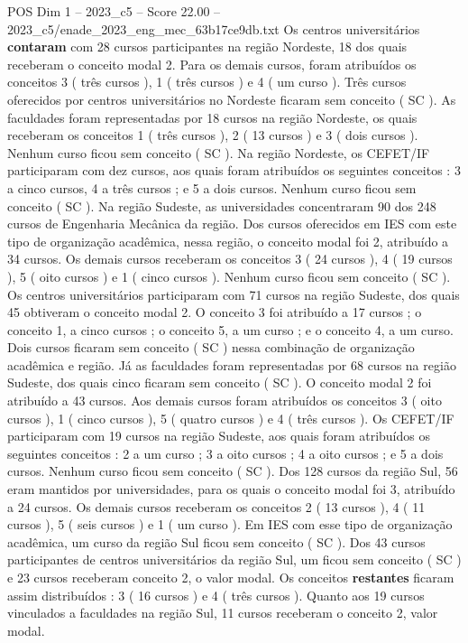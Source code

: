 \begin{textsample}{POS Dim 1 – 2023\_c5 – Score 22.00 – 2023\_c5/enade\_2023\_eng\_mec\_63b17ce9db.txt}
Os centros universitários \textbf{contaram} com 28 cursos participantes na região Nordeste, 18 dos quais receberam o conceito modal 2.
Para os demais cursos, foram atribuídos os conceitos 3 ( três cursos ), 1 ( três cursos ) e 4 ( um curso ).
Três cursos oferecidos por centros universitários no Nordeste ficaram sem conceito ( SC ).
As faculdades foram representadas por 18 cursos na região Nordeste, os quais receberam os conceitos 1 ( três cursos ), 2 ( 13 cursos ) e 3 ( dois cursos ).
Nenhum curso ficou sem conceito ( SC ).
Na região Nordeste, os CEFET/IF participaram com dez cursos, aos quais foram atribuídos os seguintes conceitos : 3 a cinco cursos, 4 a três cursos ; e 5 a dois cursos.
Nenhum curso ficou sem conceito ( SC ).
Na região Sudeste, as universidades concentraram 90 dos 248 cursos de Engenharia Mecânica da região.
Dos cursos oferecidos em IES com este tipo de organização acadêmica, nessa região, o conceito modal foi 2, atribuído a 34 cursos.
Os demais cursos receberam os conceitos 3 ( 24 cursos ), 4 ( 19 cursos ), 5 ( oito cursos ) e 1 ( cinco cursos ).
Nenhum curso ficou sem conceito ( SC ).
Os centros universitários participaram com 71 cursos na região Sudeste, dos quais 45 obtiveram o conceito modal 2.
O conceito 3 foi atribuído a 17 cursos ; o conceito 1, a cinco cursos ; o conceito 5, a um curso ; e o conceito 4, a um curso.
Dois cursos ficaram sem conceito ( SC ) nessa combinação de organização acadêmica e região.
Já as faculdades foram representadas por 68 cursos na região Sudeste, dos quais cinco ficaram sem conceito ( SC ).
O conceito modal 2 foi atribuído a 43 cursos.
Aos demais cursos foram atribuídos os conceitos 3 ( oito cursos ), 1 ( cinco cursos ), 5 ( quatro cursos ) e 4 ( três cursos ).
Os CEFET/IF participaram com 19 cursos na região Sudeste, aos quais foram atribuídos os seguintes conceitos : 2 a um curso ; 3 a oito cursos ; 4 a oito cursos ; e 5 a dois cursos.
Nenhum curso ficou sem conceito ( SC ).
Dos 128 cursos da região Sul, 56 eram mantidos por universidades, para os quais o conceito modal foi 3, atribuído a 24 cursos.
Os demais cursos receberam os conceitos 2 ( 13 cursos ), 4 ( 11 cursos ), 5 ( seis cursos ) e 1 ( um curso ).
Em IES com esse tipo de organização acadêmica, um curso da região Sul ficou sem conceito ( SC ).
Dos 43 cursos participantes de centros universitários da região Sul, um ficou sem conceito ( SC ) e 23 cursos receberam conceito 2, o valor modal.
Os conceitos \textbf{restantes} ficaram assim distribuídos : 3 ( 16 cursos ) e 4 ( três cursos ).
Quanto aos 19 cursos vinculados a faculdades na região Sul, 11 cursos receberam o conceito 2, valor modal.

\end{textsample}
